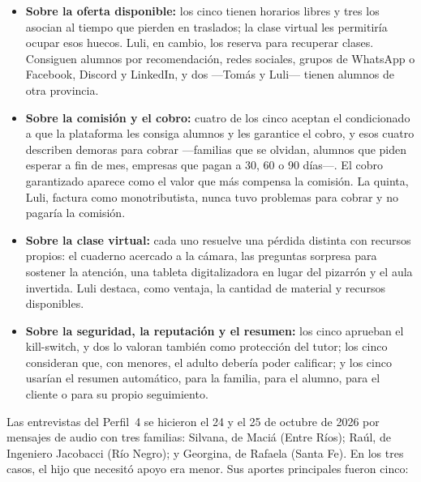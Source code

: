 \begin{itemize}
    \item \textbf{Sobre la oferta disponible:} los cinco tienen horarios
          libres y tres los asocian al tiempo que pierden en traslados; la
          clase virtual les permitiría ocupar esos huecos. Luli, en
          cambio, los reserva para recuperar clases. Consiguen
          alumnos por recomendación, redes sociales, grupos de WhatsApp o
          Facebook, Discord y LinkedIn, y dos ---Tomás y Luli--- tienen
          alumnos de otra provincia.
    \item \textbf{Sobre la comisión y el cobro:} cuatro de los cinco
          aceptan el \comision{} condicionado a que la plataforma les
          consiga alumnos y les garantice el cobro, y esos cuatro describen
          demoras para cobrar ---familias que se olvidan, alumnos que piden
          esperar a fin de mes, empresas que pagan a 30, 60 o 90 días---.
          El cobro garantizado aparece como el valor que más compensa la
          comisión. La quinta, Luli, factura como monotributista, nunca
          tuvo problemas para cobrar y no pagaría la comisión.
    \item \textbf{Sobre la clase virtual:} cada uno resuelve una pérdida
          distinta con recursos propios: el cuaderno acercado a la cámara,
          las preguntas sorpresa para sostener la atención, una tableta
          digitalizadora en lugar del pizarrón y el aula invertida. Luli
          destaca, como ventaja, la cantidad de material y recursos
          disponibles.
    \item \textbf{Sobre la seguridad, la reputación y el resumen:} los
          cinco aprueban el kill-switch, y dos lo valoran también como
          protección del tutor; los cinco consideran que, con menores, el
          adulto debería poder calificar; y los cinco usarían el resumen
          automático, para la familia, para el alumno, para el cliente o
          para su propio seguimiento.
\end{itemize}

Las entrevistas del Perfil~4 se hicieron el 24 y el 25 de octubre de 2026 por mensajes de
audio con tres familias: Silvana, de Maciá (Entre Ríos); Raúl, de
Ingeniero Jacobacci (Río Negro); y Georgina, de Rafaela (Santa Fe). En
los tres casos, el hijo que necesitó apoyo era menor. Sus aportes
principales fueron cinco:

